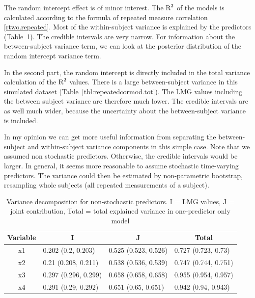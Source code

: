 \documentclass[11pt,a4paper,twoside]{book}
\begin{document}
The random intercept effect is of minor interest. The $\text{R}^2$ of the models is calculated according to the formula of repeated measure correlation \eqref{rtwo.repeated}.  Most of the within-subject variance is explained by the predictors (Table~\ref{tbl:repeatedcormod}). The credible intervals are very narrow. For information about the between-subject variance term, we can look at the posterior distribution of the random intercept variance term.

In the second part, the random intercept is directly included in the total variance calculation of the $\text{R}^2$ values. There is a large between-subject variance in this simulated dataset (Table~\ref{tbl:repeatedcormod.tot}). The LMG values including the between subject variance are  therefore much lower. The credible intervals are as well much wider, because the uncertainty about the between-subject variance is included. 

In my opinion we can get more useful information from separating the between-subject and within-subject variance components in this simple case. Note that we assumed non stochastic predictors. Otherwise, the credible intervals would be larger. In general, it seems more reasonable to assume stochastic time-varying predictors. The variance could then be estimated by non-parametric bootstrap, resampling whole subjects (all repeated measurements of a subject).





\begin{table}[h]
\caption{Variance decomposition for non-stochastic predictors. I = LMG values, J = joint contribution, Total = total explained variance in one-predictor only model}
\centering
\begin{tabular}{clll}
  \toprule
  \multicolumn{1}{c}{\textbf{Variable}} & \multicolumn{1}{c}{\textbf{I}} &\multicolumn{1}{c}{\textbf{J}} & \multicolumn{1}{c}{\textbf{Total}} \\
  \hline
x1 & 0.202 (0.2, 0.203)  & 0.525 (0.523, 0.526)   & 0.727 (0.723, 0.73)  \\ 
x2 & 0.21 (0.208, 0.211)  & 0.538 (0.536, 0.539)   & 0.747 (0.744, 0.751)  \\ 
x3 & 0.297 (0.296, 0.299)  & 0.658 (0.658, 0.658)   & 0.955 (0.954, 0.957)  \\ 
x4 & 0.291 (0.29, 0.292)  & 0.651 (0.65, 0.651)   & 0.942 (0.94, 0.943)  \\ 
   \bottomrule
\end{tabular}
\label{tbl:repeatedcormod}
\end{table}
\end{document}
